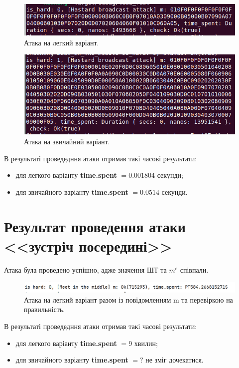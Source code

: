         \begin{figure}[!h]
            \centering
            \includegraphics[width=0.5\linewidth]{Images/chinese_easy.png}
            \caption{Атака на легкий варіант.}
            \label{fig:chinese_easy}
        \end{figure}

        \begin{figure}[!h]
            \centering
            \includegraphics[width=0.5\linewidth]{Images/chinese_hard.png}
            \caption{Атака на звичайний варіант.}
            \label{fig:chinese_hard}
        \end{figure}

В результаті проведедння атаки отримав такі часові результати:
\begin{itemize}
    \item для легкого варіанту \textbf{time.spent} $=0.001804$ секунди;  
    \item для звичайного варіанту \textbf{time.spent} $=0.0514$ секунди.
\end{itemize}

\section{Результат проведення атаки <<зустріч посередині>>}
Атака була проведено успішно, адже значення ШТ та $m^e$ співпали.

\begin{figure}[!h]
            \centering
            \includegraphics[scale=0.35]{Images/middle_easy.png}
            \caption{Атака на легкий варіант разом із повідомленням m та перевіркою на правильність.}
            \label{fig:middle_easy}
        \end{figure}

В результаті проведедння атаки отримав такі часові результати:
\begin{itemize}
    \item для легкого варіанту \textbf{time.spent} $=9$ хвилин;  
    \item для звичайного варіанту \textbf{time.spent} $=?$ не зміг дочекатися.
\end{itemize}

